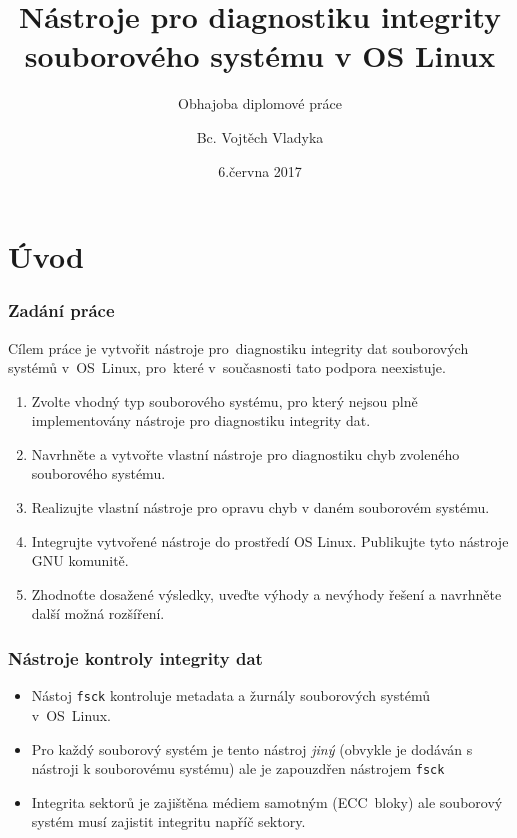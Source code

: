 \documentclass[aspectratio=169]{beamer}
\title{Nástroje pro diagnostiku integrity souborového systému v OS Linux}
\subtitle{Obhajoba diplomové práce}
\author{Bc. Vojtěch Vladyka}
\date{6.června 2017}
\begin{document}
	\addtolength{\textwidth}{-20pt}
	\addtolength{\textheight}{-20pt}
  \frame{\titlepage}
   
	\section{Úvod}
		\begin{frame}
			\frametitle{Zadání práce}
			\vspace{40 pt}
			\large 
            Cílem práce je vytvořit nástroje pro~diagnostiku integrity dat souborových systémů v~OS~Linux, pro~které v~současnosti tato podpora neexistuje.
            \vspace{10pt}
            \begin{enumerate}
                \item Zvolte vhodný typ souborového systému, pro který nejsou plně implementovány nástroje pro diagnostiku integrity dat.
                \item Navrhněte a vytvořte vlastní nástroje pro diagnostiku chyb zvoleného souborového systému.
                \item Realizujte vlastní nástroje pro opravu chyb v daném souborovém systému.
                \item Integrujte vytvořené nástroje do prostředí OS Linux. Publikujte tyto nástroje GNU komunitě.
                \item Zhodnoťte dosažené výsledky, uveďte výhody a nevýhody řešení a navrhněte další možná rozšíření.
            \end{enumerate}
		\end{frame}
        \begin{frame}
            \frametitle{Nástroje kontroly integrity dat}
            \vspace{40pt}
            \begin{itemize}
                \Large\item Nástoj \texttt{fsck} kontroluje metadata a žurnály souborových systémů v~OS~Linux.
                \Large\item Pro každý souborový systém je tento nástroj \textit{jiný} (obvykle je dodáván s nástroji k souborovému systému) ale je zapouzdřen nástrojem \texttt{fsck}
                \Large\item Integrita sektorů je zajištěna médiem samotným (ECC~bloky) ale souborový systém musí zajistit integritu napříč sektory.
            \end{itemize}
        \end{frame}
\end{document}
